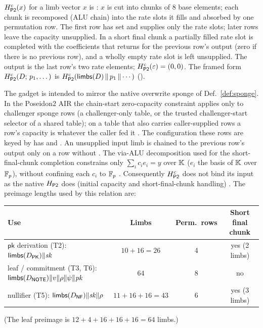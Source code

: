 \begin{definition}
$H_{\mathsf{P2}}^{\mathrm{c}}(x)$ for a limb vector $x$ is : $x$ is cut into
chunks of $8$ base elements; each chunk is recomposed (ALU 
chain) into the rate slots it fills and absorbed by one permutation row. The
first row has  set and supplies only the rate slots; later rows
leave the capacity unsupplied. In a short final chunk a partially filled rate
slot is completed with the coefficients that
 returns for the previous row's
output (zero if there is no previous row), and a wholly empty rate slot is left
unsupplied. The output is the last row's two rate elements;
$H_{\mathsf{P2}}^{\mathrm{c}}(\varepsilon)=(0,0)$.
The framed form $H_{\mathsf{P2}}^{\mathrm{c}}(D;\,p_1,\dots)$ is $H_{\mathsf{P2}}^{\mathrm{c}}(\mathsf{limbs}(D)\,\|\,p_1\,\|\cdots)$
().
\end{definition}

The gadget is intended to mirror the native overwrite sponge of
Def.~\ref{def:sponge}. In the Poseidon2 AIR the chain-start zero-capacity
constraint applies only to challenger sponge rows (a challenger-only table, or
the trusted challenger-start selector of a shared table); on a table that also
carries caller-supplied rows a  row's capacity is whatever the
caller fed it
.
The configuration these rows are keyed by has  and
. An unsupplied input limb is
chained to the previous row's output only on a row without 
.
The via-ALU decomposition used for the short-final-chunk completion constrains
only $\sum_i c_i e_i = y$ over $\mathbb{K}$ ($e_i$ the basis of $\mathbb{K}$ over $\mathbb{F}_p$), without
confining each $c_i$ to $\mathbb{F}_p$
.
Consequently $H_{\mathsf{P2}}^{\mathrm{c}}$ does not bind its input as the native $H_{\mathsf{P2}}$
does (initial capacity and short-final-chunk handling) . The
preimage lengths used by this relation are:

\begin{center}
\small
\begin{tabularx}{\linewidth}{@{}X c c c@{}}
\toprule
Use & Limbs & Perm.\ rows & Short final chunk \\
\midrule
$\mathsf{pk}$ derivation (T2): $\mathsf{limbs}(D_{\mathsf{PK}})\|\mathit{sk}$ & $10+16=26$ & 4 & yes (2 limbs) \\
leaf / commitment (T3, T6): $\mathsf{limbs}(D_{\mathsf{NOTE}})\|v\|\rho\|\psi\|\mathit{pk}$ & $64$ & 8 & no \\
nullifier (T5): $\mathsf{limbs}(D_{\mathsf{NF}})\|\mathit{sk}\|\rho$ & $11+16+16=43$ & 6 & yes (3 limbs) \\
\bottomrule
\end{tabularx}
\end{center}
(The leaf preimage is $12+4+16+16+16=64$ limbs.)

